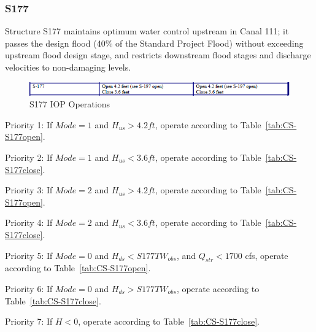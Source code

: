 \clearpage

\subsubsection{S177}

Structure S177 maintains optimum water control upstream in Canal 111; it passes the design flood (40\% of the Standard Project Flood) without exceeding upstream flood design stage, and restricts downstream flood stages and discharge velocities to non-damaging levels.

\begin{figure}[!h]
  \begin{center}
  \includegraphics[width=6.5in]{../figs/S177_IOPops.png}
  \caption{S177 IOP Operations}
  \label{fig:S177iop}
  \end{center}
\end{figure}

\begin{packed_items}
\item Priority 1: If $Mode=1$ and $H_{us}>4.2 ft$, operate according to Table~\ref{tab:CS-S177open}.
\item Priority 2: If $Mode=1$ and $H_{us}<3.6 ft$, operate according to Table~\ref{tab:CS-S177close}.
\item[]
\item Priority 3: If $Mode=2$ and $H_{us}>4.2 ft$, operate according to Table~\ref{tab:CS-S177open}.
\item Priority 4: If $Mode=2$ and $H_{us}<3.6 ft$, operate according to Table~\ref{tab:CS-S177close}.
\item[]
\item Priority 5: If $Mode=0$ and $H_{ds}<S177TW_{obs}$, and $Q_{str}<1700$ cfs, operate according to Table~\ref{tab:CS-S177open}.
\item Priority 6: If $Mode=0$ and $H_{ds}>S177TW_{obs}$, operate according to Table~\ref{tab:CS-S177close}.
\item[]
\item Priority 7: If $H<0$, operate according to Table~\ref{tab:CS-S177close}.
\end{packed_items}

